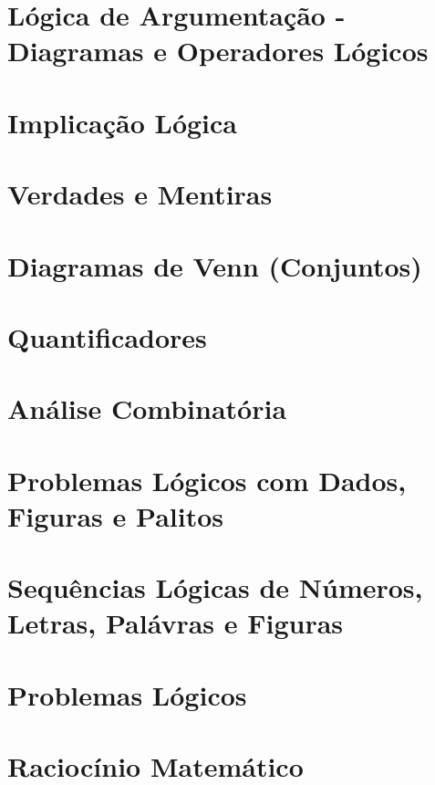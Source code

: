 \section{Lógica de Argumentação - Diagramas e Operadores Lógicos}

\section{Implicação Lógica}

\section{Verdades e Mentiras}

\section{Diagramas de Venn (Conjuntos)}

\section{Quantificadores}

\section{Análise Combinatória}

\section{Problemas Lógicos com Dados, Figuras e Palitos}

\section{Sequências Lógicas de Números, Letras, Palávras e Figuras}

\section{Problemas Lógicos}

\section{Raciocínio Matemático}